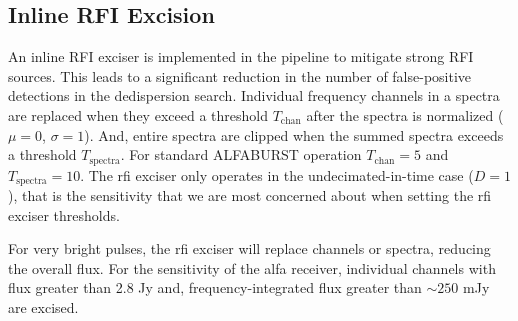 \documentclass[a4paper,fleqn,usenatbib]{mnras}
\begin{document}

\subsection{Inline RFI Excision}
\label{sec:rfi_excise}

An inline RFI exciser is implemented in the pipeline to mitigate strong RFI
sources. This leads to a significant reduction in the number of false-positive
detections in the dedispersion search.  Individual frequency channels in a
spectra are replaced when they exceed a threshold $T_{\textrm{chan}}$ after the
spectra is normalized ($\mu=0$, $\sigma=1$). And, entire spectra are clipped
when the summed spectra exceeds a threshold $T_{\textrm{spectra}}$. For standard
ALFABURST operation $T_{\textrm{chan}} = 5$ and $T_{\textrm{spectra}} = 10$.
The \gls{rfi} exciser only operates in the undecimated-in-time case ($D=1$), that
is the sensitivity that we are most concerned about when setting the \gls{rfi}
exciser thresholds.

For very bright pulses, the \gls{rfi} exciser will replace channels or spectra,
reducing the overall flux.  For the sensitivity of the \gls{alfa} receiver,
individual channels with flux greater than 2.8 Jy and, frequency-integrated flux
greater than $\sim250$ mJy are excised.





\end{document}
